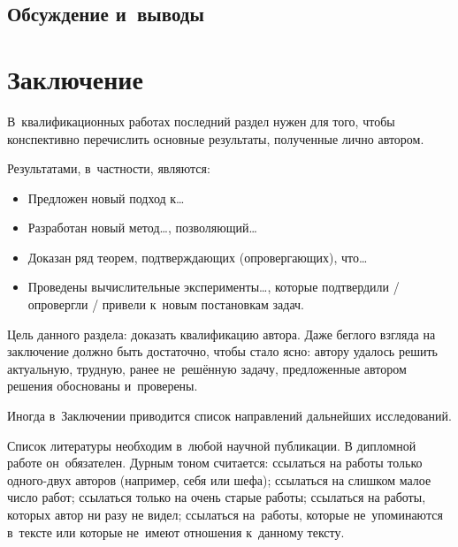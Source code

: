 \documentclass[12pt]{article}
\begin{document}
\subsection{Обсуждение и~выводы}


\section{Заключение}

В~квалификационных работах последний раздел нужен для того, чтобы
конспективно перечислить основные результаты, полученные лично
автором.

Результатами, в~частности, являются:
\begin{itemize}
\item
    Предложен новый подход к\dots
\item
    Разработан новый метод\dots, позволяющий\dots
\item
    Доказан ряд теорем, подтверждающих (опровергающих), что\dots
\item
    Проведены вычислительные эксперименты\dots, которые подтвердили /
    опровергли / привели к~новым постановкам задач.
\end{itemize}

Цель данного раздела: доказать квалификацию автора.  Даже беглого
взгляда на заключение должно быть достаточно, чтобы стало ясно: автору
удалось решить актуальную, трудную, ранее не~решённую задачу,
предложенные автором решения обоснованы и~проверены.

Иногда в~Заключении приводится список направлений дальнейших
исследований.

\newpage
Список литературы необходим в~любой научной публикации. В дипломной
работе он~обязателен. Дурным тоном считается: ссылаться на работы
только одного-двух авторов (например, себя или шефа); ссылаться на
слишком малое число работ; ссылаться только на очень старые работы;
ссылаться на работы, которых автор ни разу не видел; ссылаться
на~работы, которые не~упоминаются в~тексте или которые не~имеют
отношения к~данному тексту.
\end{document}
